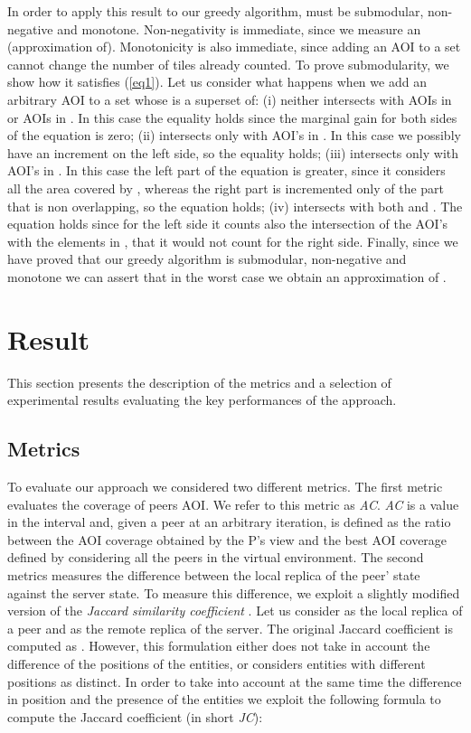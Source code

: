 \documentclass[final,10pt,a5paper]{phdimt}
\theoremstyle{definition}
\begin{document}
In order to apply this result to our greedy algorithm,  must be submodular, non-negative and monotone. Non-negativity is immediate, since we measure an (approximation of). Monotonicity is also immediate, since adding an AOI to a set cannot change the number of tiles already counted. 
To prove submodularity, we show how it satisfies (\ref{eq1}). Let us consider what happens when we add an arbitrary AOI  to a set  whose  is a superset of: (i)  neither intersects with AOIs in  or AOIs in . In this case the equality holds since the marginal gain for both sides of the equation is zero; (ii)  intersects only with AOI's in . In this case we possibly have an increment on the left side, so the equality holds; (iii)  intersects only with AOI's in . In this case the left part of the equation is greater, since it considers all the area covered by , whereas the right part is incremented only of the part that is non overlapping, so the equation holds; (iv)  intersects with both  and . The equation holds since for the left side it counts also the intersection of the AOI's with the elements in , that it would not count for the right side.
Finally, since we have proved that our greedy algorithm is submodular, non-negative and monotone we can assert that in the worst case we obtain an approximation of .



\section{Result}


This section presents the description of the metrics and a selection of experimental results evaluating the key performances of the approach.



\subsection{Metrics}

To evaluate our approach we considered two different metrics. 
The first metric evaluates the coverage of peers AOI. We refer to this metric as \textit{AC}. \textit{AC} is a value in the interval  and, given a peer at an arbitrary iteration, is defined as  the ratio between the AOI coverage obtained by the P's view and the best AOI coverage defined by considering all the peers in the virtual environment. 
The second metrics measures the difference between the local replica of the peer' state against the server state.
To measure this difference, we exploit a slightly modified version of the \textit{Jaccard similarity coefficient} \cite{lee1999measures}.
Let us consider  as the local replica of a peer and  as the remote replica of the server.
The original Jaccard coefficient is computed as .
However, this formulation either does not take in account the difference of the positions of the entities, or considers entities with different positions as distinct.
In order to take into account at the same time the difference in position and the presence of the entities we exploit the following formula to compute the Jaccard coefficient (in short \textit{JC}):
\end{document}

